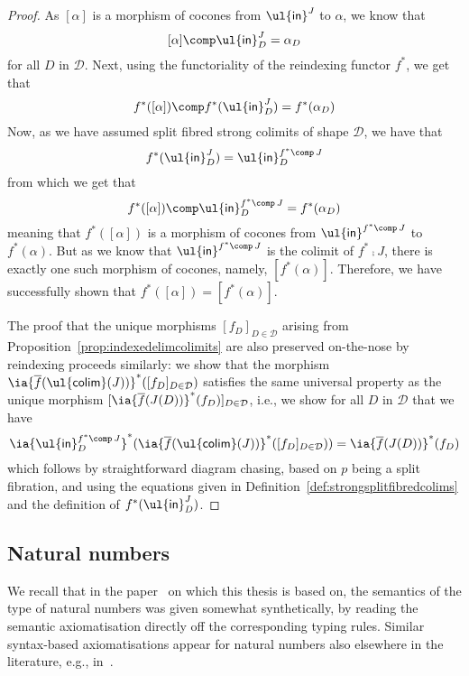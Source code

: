 \begin{proof}
As $[\alpha]$ is a morphism of cocones from $\mathsf{\ul{in}}^J$ to $\alpha$, we know that
\[
[\alpha] \comp \mathsf{\ul{in}}^J_D = \alpha_D
\]
for all $D$ in $\mathcal{D}$. Next, using the functoriality of the reindexing functor $f^*$, we get that
\[
f^*([\alpha]) \comp f^*(\mathsf{\ul{in}}^J_D) = f^*(\alpha_D)
\]
Now, as we have assumed split fibred strong colimits of shape $\mathcal{D}$, we have that
\[
f^*(\mathsf{\ul{in}}^J_D) = \mathsf{\ul{in}}^{f^* \comp\, J}_D
\]
from which we get that
\[
f^*([\alpha]) \comp \mathsf{\ul{in}}^{f^* \comp\, J}_D = f^*(\alpha_D)
\]
meaning that $f^*([\alpha])$ is a morphism of cocones from $\mathsf{\ul{in}}^{f^* \comp\, J}$ to $f^*(\alpha)$. But as we know that $\mathsf{\ul{in}}^{f^* \comp\, J}$ is the colimit of $f^* \comp J$, there is exactly one such morphism of cocones, namely, $[f^*(\alpha)]$. Therefore, we have successfully shown that $f^*([\alpha]) = [f^*(\alpha)]$.

The proof that the unique morphisms $[f_D]_{D \in \mathcal{D}}$ arising from Proposition~\ref{prop:indexedelimcolimits} are also preserved on-the-nose by reindexing proceeds similarly: we show that the morphism $\ia {\overline{f}(\mathsf{\ul{colim}}(J))}^*([f_D]_{D \in \mathcal{D}})$ satisfies the same universal property as the unique morphism $[\ia {\overline{f}(J(D))}^*(f_D)]_{D \in \mathcal{D}}$, i.e., we show for all $D$ in $\mathcal{D}$ that we have 
\[
\ia {\mathsf{\ul{in}}^{f^* \comp\, J}_D}^*(\ia {\overline{f}(\mathsf{\ul{colim}}(J))}^*([f_D]_{D \in \mathcal{D}}))
=
\ia {\overline{f}(J(D))}^*(f_D)
\]
which follows by straightforward diagram chasing, 
based on $p$ being a split fibration, and using the equations given in Definition~\ref{def:strongsplitfibredcolims} and the definition of $f^*(\mathsf{\ul{in}}^J_D)$.
\end{proof}

\subsection{Natural numbers}


We recall that in the paper~\cite{Ahman:FibredEffects} on which this thesis is based on, the semantics of the type of natural numbers was given somewhat synthetically, by reading the semantic axiomatisation directly off the corresponding typing rules. 
Similar syntax-based axiomatisations appear for natural numbers also elsewhere in the literature, e.g., in~\cite{Atkey:DepTypes}.

